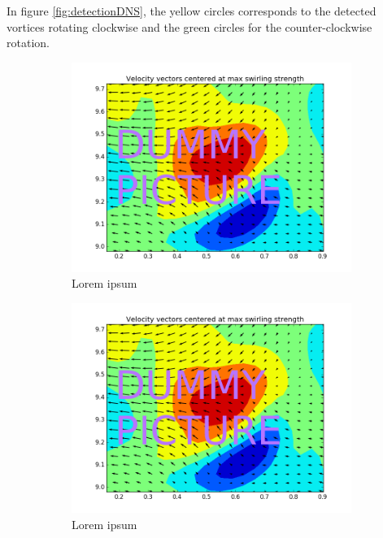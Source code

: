 \documentclass[12pt, a4paper, openany]{memoir}
\begin{document}
In figure \ref{fig:detectionDNS}, the yellow circles corresponds to the detected vortices rotating clockwise and the green circles for the counter-clockwise rotation.

\begin{figure}[h!]
	\centering
	\begin{subfigure}[b]{0.4\textwidth}
		\centering
		\includegraphics[width=\textwidth]{figure/dummy.png}
		\caption{Lorem ipsum}
	\end{subfigure}
	\begin{subfigure}[b]{0.4\textwidth}
		\centering
		\includegraphics[width=\textwidth]{figure/dummy.png}
		\caption{Lorem ipsum}
	\end{subfigure}
	\begin{subfigure}[b]{0.4\textwidth}

\end{subfigure}
\end{figure}
\end{document}
